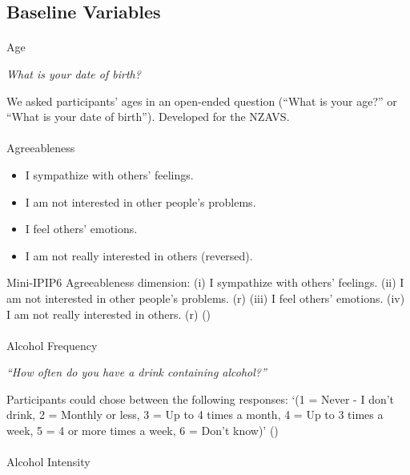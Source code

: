\documentclass[
  single column]{article}
\makeatletter
\let\oldparagraph\paragraph
\renewcommand{\paragraph}{
    \@ifstar
      \xxxParagraphStar
      \xxxParagraphNoStar
  }
\newcommand{\xxxParagraphStar}[1]{\oldparagraph*{#1}\mbox{}}
\newcommand{\xxxParagraphNoStar}[1]{\oldparagraph{#1}\mbox{}}
\providecommand{\tightlist}{%
  \setlength{\itemsep}{0pt}\setlength{\parskip}{0pt}}\usepackage{longtable,booktabs,array}
\makeatother
\begin{document}
\subsection{Baseline Variables}\label{baseline-variables}

\paragraph{Age}\label{age}

\emph{What is your date of birth?}

We asked participants' ages in an open-ended question (``What is your
age?'' or ``What is your date of birth''). Developed for the NZAVS.

\paragraph{Agreeableness}\label{agreeableness}

\begin{itemize}
\tightlist
\item
  I sympathize with others' feelings.
\item
  I am not interested in other people's problems.
\item
  I feel others' emotions.
\item
  I am not really interested in others (reversed).
\end{itemize}

Mini-IPIP6 Agreeableness dimension: (i) I sympathize with others'
feelings. (ii) I am not interested in other people's problems. (r) (iii)
I feel others' emotions. (iv) I am not really interested in others. (r)
()

\paragraph{Alcohol Frequency}\label{alcohol-frequency}

\emph{``How often do you have a drink containing alcohol?''}

Participants could chose between the following responses: `(1 = Never -
I don't drink, 2 = Monthly or less, 3 = Up to 4 times a month, 4 = Up to
3 times a week, 5 = 4 or more times a week, 6 = Don't know)'
()

\paragraph{Alcohol Intensity}\label{alcohol-intensity}
\end{document}
